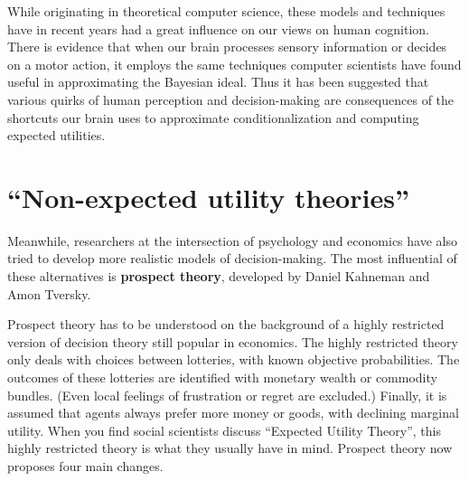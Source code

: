 While originating in theoretical computer science, these models and
techniques have in recent years had a great influence on our views on
human cognition. There is evidence that when our brain processes
sensory information or decides on a motor action, it employs the same
techniques computer scientists have found useful in approximating the
Bayesian ideal. Thus it has been suggested that various quirks of
human perception and decision-making are consequences of the shortcuts
our brain uses to approximate conditionalization and computing
expected utilities.%



\section{``Non-expected utility theories''}

Meanwhile, researchers at the intersection of psychology and economics
have also tried to develop more realistic models of
decision-making. The most influential of these alternatives is
\textbf{prospect theory}, developed by Daniel Kahneman and Amon
Tversky.

Prospect theory has to be understood on the background of a highly
restricted version of decision theory still popular in economics. The
highly restricted theory only deals with choices between lotteries,
with known objective probabilities. The outcomes of these lotteries
are identified with monetary wealth or commodity bundles. (Even local
feelings of frustration or regret are excluded.)  Finally, it is
assumed that agents always prefer more money or goods, with declining
marginal utility. When you find social scientists discuss ``Expected
Utility Theory'', this highly restricted theory is what they usually
have in mind. Prospect theory now proposes four main changes.

